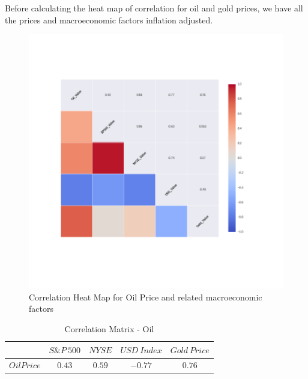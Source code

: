 \documentclass[runningheads]{llncs}
\begin{document}
\noindent Before calculating the heat map of correlation for oil and gold prices, we have all the prices and macroeconomic factors inflation adjusted.

\begin{figure}
\centering
\includegraphics[width=\textwidth]{Correlation_Oil_Value_.png}
\caption{Correlation Heat Map for Oil Price and related macroeconomic factors}
\label{fig:Correlation_Oil_Value_.png}
\end{figure}

\begin{table}
\begin{center}
\begin{tabular}{|c|c|c|c|c|}
\hline
$ $ & $ S\&P\ 500 $ & $ NYSE $ & $ USD\ Index $ & $Gold\ Price$ \\ \hline
$Oil Price$ & $0.43$ & $0.59$ & $-0.77$ & $0.76$ \\ \hline
\end{tabular}
\end{center}
\caption{Correlation Matrix - Oil}
\end{table}
\end{document}
